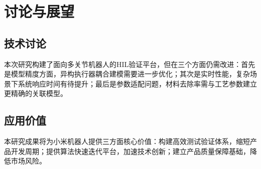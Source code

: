 \documentclass[12pt]{article}
\begin{document}
\section{讨论与展望}
\subsection{技术讨论}

本次研究构建了面向多关节机器人的HIL验证平台，但在三个方面仍需改进：首先是模型精度方面，异构执行器耦合建模需要进一步优化；其次是实时性能，复杂场景下系统响应时间有待提升；最后是参数适配问题，材料去除率需与工艺参数建立更精确的关联模型。

\subsection{应用价值}

本研究成果将为小米机器人提供三方面核心价值：构建高效测试验证体系，缩短产品开发周期；提供算法快速迭代平台，加速技术创新；建立产品质量保障基础，降低市场风险。
\end{document}
